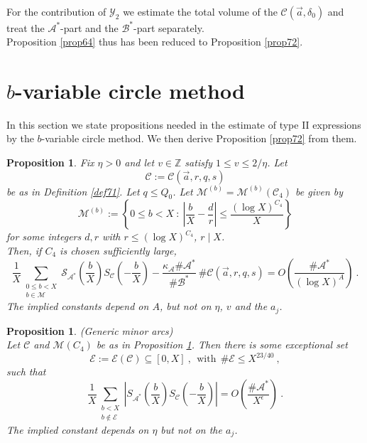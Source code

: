 \documentclass{amsart}
\newtheorem{proposition}[theorem]{Proposition}
\numberwithin{equation}{subsection}
\begin{document}
\noindent For the contribution of $\mathcal{Y}_2$ we estimate the total volume of the $\mathcal{C}(\vec{a}, \delta_0)$ and treat the $\mathcal{A}^*$-part and the $\mathcal{B}^*$-part separately.\\
Proposition \ref{prop64} thus has been reduced to Proposition \ref{prop72}.




\section{$b$-variable circle method}

In this section we state propositions needed in the estimate of type II expressions by the $b$-variable circle method. We then derive Proposition \ref{prop72} from them.

\begin{proposition}\label{prop81}
Fix $\eta>0$ and let $v\in \mathbb{Z}$ satisfy $1\leq v\leq 2/\eta$. Let 
$$\mathcal{C}:=\mathcal{C}(\vec{a}, r, q, s)$$
be as in Definition \ref{def71}. Let $q\leq Q_0$. Let $\mathcal{M}^{(b)}=\mathcal{M}^{(b)}(\mathcal{C}_4)$ be given by
$$\mathcal{M}^{(b)}:=\left\{ 0\leq b< X\::\: \left|\frac{b}{X}-\frac{d}{r}\right|\leq \frac{(\log X)^{C_4}}{X} \right\} $$
for some integers $d, r$ with $r\leq (\log X)^{C_4}$, $r\mid X$.\\
Then, if $C_4$ is chosen sufficiently large,
$$\frac{1}{X}\sum_{\substack{0\leq b< X \\ b\in \mathcal{M}}} \mathcal{S}_{\mathcal{A}^*} \left(\frac{b}{X}\right)S_{\mathcal{C}}\left(-\frac{b}{X}\right)-\frac{\kappa_{\mathcal{A}}\#\mathcal{A}^*}{\#\mathcal{B}^*} \ \#\mathcal{C}(\vec{a}, r, q, s)=O\left(\frac{\# \mathcal{A}^*}{(\log X)^A} \right)\:.$$
The implied constants depend on $A$, but not on $\eta$, $v$ and the $a_j$.
\end{proposition}

\begin{proposition}\label{prop82}(Generic minor arcs)\\
Let $\mathcal{C}$ and $\mathcal{M}(C_4)$ be as in Proposition \ref{prop81}. Then there is some exceptional set
$$\mathcal{E}:=\mathcal{E}(\mathcal{C}) \subseteq [0,X]\:,\ \ \text{with}\ \ \#\mathcal{E}\leq X^{23/40}\:,$$
such that
$$\frac{1}{X}\sum_{\substack{b< X \\ b\not\in \mathcal{E}}} \left| S_{\mathcal{A}^*}\left(\frac{b}{X}\right) S_{\mathcal{C}}\left(-\frac{b}{X}\right)  \right| =O\left( \frac{\# \mathcal{A}^*}{X^\epsilon} \right)  \:. $$
The implied constant depends on $\eta$ but not on the $a_j$.
\end{proposition}
\end{document}
